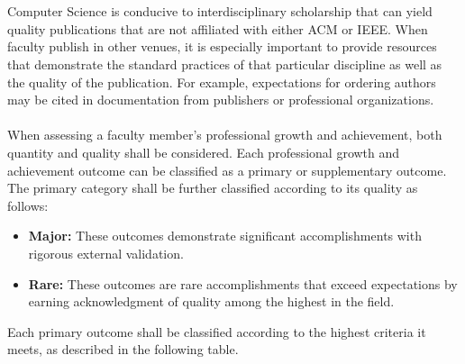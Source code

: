 \documentclass{article}
\begin{document}
\\\\
Computer Science is conducive to interdisciplinary scholarship that can yield quality publications that are not affiliated with either ACM or IEEE. When faculty publish in other venues, it is especially important to provide resources that demonstrate the standard practices of that particular discipline as well as the quality of the publication. For example, expectations for ordering authors may be cited in documentation from publishers or professional organizations.
\\\\
When assessing a faculty member’s professional growth and achievement, both quantity and quality shall be considered. Each professional growth and achievement outcome can be classified as a primary or supplementary outcome. The primary category shall be further classified according to its quality as follows:
\begin{itemize}
\item \textbf{Major:} These outcomes demonstrate significant accomplishments with rigorous external validation.
\item \textbf{Rare:} These outcomes are rare accomplishments that exceed expectations by earning acknowledgment of quality among the highest in the field.
\end{itemize}
Each primary outcome shall be classified according to the highest criteria it meets, as described in the following table.
\end{document}
